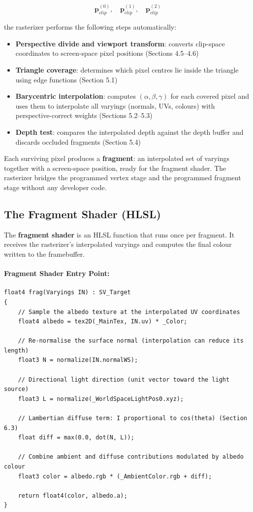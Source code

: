 \documentclass[11pt]{article}
\begin{document}
\begin{equation}
    \mathbf{p}_{clip}^{(0)}, \quad \mathbf{p}_{clip}^{(1)}, \quad \mathbf{p}_{clip}^{(2)}
\end{equation}

the rasterizer performs the following steps automatically:

\begin{itemize}
    \item \textbf{Perspective divide and viewport transform}: converts clip-space coordinates to screen-space pixel positions (Sections 4.5--4.6)
    \item \textbf{Triangle coverage}: determines which pixel centres lie inside the triangle using edge functions (Section 5.1)
    \item \textbf{Barycentric interpolation}: computes $(\alpha, \beta, \gamma)$ for each covered pixel and uses them to interpolate all varyings (normals, UVs, colours) with perspective-correct weights (Sections 5.2--5.3)
    \item \textbf{Depth test}: compares the interpolated depth against the depth buffer and discards occluded fragments (Section 5.4)
\end{itemize}

Each surviving pixel produces a \textbf{fragment}: an interpolated set of varyings together with a screen-space position, ready for the fragment shader. The rasterizer bridges the programmed vertex stage and the programmed fragment stage without any developer code.


\subsection{The Fragment Shader (HLSL)}

The \textbf{fragment shader} is an HLSL function that runs once per fragment. It receives the rasterizer's interpolated varyings and computes the final colour written to the framebuffer.

\paragraph{Fragment Shader Entry Point:}

\begin{lstlisting}
float4 frag(Varyings IN) : SV_Target
{
    // Sample the albedo texture at the interpolated UV coordinates
    float4 albedo = tex2D(_MainTex, IN.uv) * _Color;

    // Re-normalise the surface normal (interpolation can reduce its length)
    float3 N = normalize(IN.normalWS);

    // Directional light direction (unit vector toward the light source)
    float3 L = normalize(_WorldSpaceLightPos0.xyz);

    // Lambertian diffuse term: I proportional to cos(theta) (Section 6.3)
    float diff = max(0.0, dot(N, L));

    // Combine ambient and diffuse contributions modulated by albedo colour
    float3 color = albedo.rgb * (_AmbientColor.rgb + diff);

    return float4(color, albedo.a);
}
\end{lstlisting}
\end{document}
